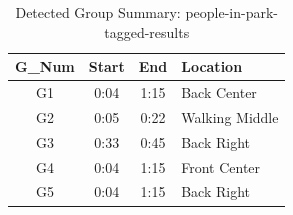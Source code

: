 \begin{table}[H]
    \centering
    \caption{Detected Group Summary: people-in-park-tagged-results}
    \label{tab:group-summary-2}
    \begin{tabular}{c c c l}
        \toprule
        \textbf{G\_Num} & \textbf{Start} & \textbf{End} & \textbf{Location} \\
        \midrule
        G1 & 0:04 & 1:15 & Back Center \\
        G2 & 0:05 & 0:22 & Walking Middle \\
        G3 & 0:33 & 0:45 & Back Right \\
        G4 & 0:04 & 1:15 & Front Center \\
        G5 & 0:04 & 1:15 & Back Right \\
        \bottomrule
    \end{tabular}
\end{table}
